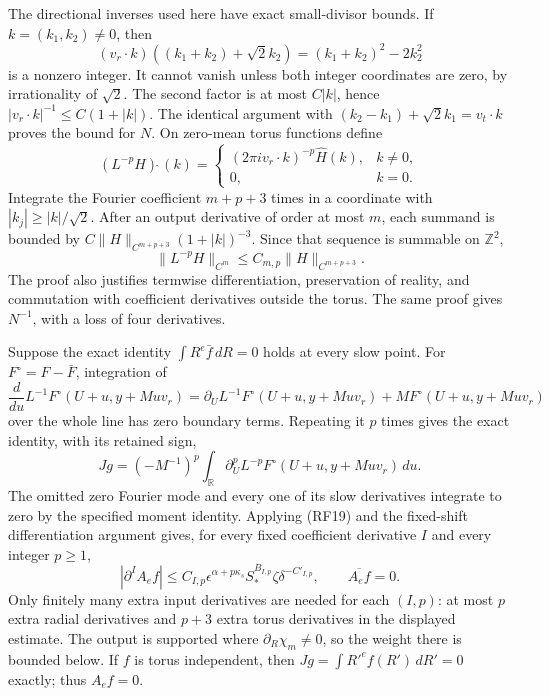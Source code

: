 \documentclass[10pt,a4paper]{article}
\begin{document}
The directional inverses used here have exact small-divisor bounds. If
\(k=(k_1,k_2)\ne0\), then
\[
(v_r\cdot k)((k_1+k_2)+\sqrt2k_2)=(k_1+k_2)^2-2k_2^2
\]
is a nonzero integer. It cannot vanish unless both integer coordinates
are zero, by irrationality of \(\sqrt2\). The second factor is at
most \(C|k|\), hence \(|v_r\cdot k|^{-1}\le C(1+|k|)\).
The identical argument with \((k_2-k_1)+\sqrt2k_1=v_t\cdot k\)
proves the bound for \(N\).
On zero-mean torus functions define
\[
(L^{-p}H)\widehat{\ }(k)=
\begin{cases}(2\pi i v_r\cdot k)^{-p}\widehat H(k),&k\ne0,\\0,&k=0.
\end{cases}
\]
Integrate the Fourier coefficient \(m+p+3\) times in a coordinate
with \(|k_j|\ge |k|/\sqrt2\). After an output derivative of order
at most \(m\), each summand is bounded by
\(C\|H\|_{C^{m+p+3}}(1+|k|)^{-3}\). Since that sequence is
summable on \(\mathbb Z^2\),
\[
\|L^{-p}H\|_{C^m}\le C_{m,p}\|H\|_{C^{m+p+3}}.
\tag{RF19}
\]
The proof also justifies termwise differentiation, preservation of
reality, and commutation with coefficient derivatives outside the torus.
The same proof gives \(N^{-1}\), with a loss of four derivatives.

Suppose the exact identity
\(\int R^e\bar f\,dR=0\) holds at every slow point.
For \(F^\circ=F-\bar F\), integration of
\[
\frac d{du}L^{-1}F^\circ(U+u,y+Muv_r)
=\partial_UL^{-1}F^\circ(U+u,y+Muv_r)+MF^\circ(U+u,y+Muv_r)
\]
over the whole line has zero boundary terms. Repeating it \(p\) times
gives the exact identity, with its retained sign,
\[
Jg=(-M^{-1})^p\int_{\mathbb R}
\partial_U^pL^{-p}F^\circ(U+u,y+Muv_r)\,du.
\tag{RF20}
\]
The omitted zero Fourier mode and every one of its slow derivatives
integrate to zero by the specified moment identity. Applying (RF19) and
the fixed-shift differentiation argument gives, for every fixed
coefficient derivative \(I\) and every integer \(p\ge1\),
\[
|\partial^IA_ef|\le C_{I,p}\epsilon^{\alpha+p\kappa_s}
S_*^{B_{I,p}}\zeta\delta^{-C'_{I,p}},\qquad
\overline{A_ef}=0.
\tag{RF21}
\]
Only finitely many extra input derivatives are needed for each
\((I,p)\): at most \(p\) extra radial derivatives and
\(p+3\) extra torus derivatives in the displayed estimate. The output
is supported where \(\partial_R\chi_m\ne0\), so the weight
there is bounded below. If \(f\) is torus independent, then
\(Jg=\int R'^e f(R')\,dR'=0\) exactly; thus \(A_ef=0\).
\end{document}
